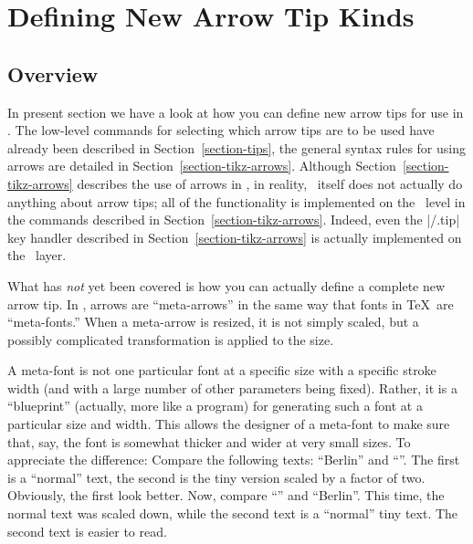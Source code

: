 %
%
%


\section{Defining New Arrow Tip Kinds}
\label{section-arrows}


\subsection{Overview}

In present section we have a look at how you can define new arrow tips
for use in \pgfname. The low-level commands for selecting which arrow
tips are to be used have already been described in
Section~\ref{section-tips}, the general syntax rules for using arrows
are detailed in Section~\ref{section-tikz-arrows}. Although
Section~\ref{section-tikz-arrows} describes the use of arrows in
\tikzname, in reality, \tikzname\ itself does not actually do anything
about arrow tips; all of the functionality is implemented on the
\pgfname\ level in the commands described in
Section~\ref{section-tikz-arrows}. Indeed, even the |/.tip| key
handler described in Section~\ref{section-tikz-arrows} is actually
implemented on the \pgfname\ layer.

What has \emph{not} yet been covered is how you can actually define a
complete new arrow tip. In \pgfname, arrows are ``meta-arrows'' in the
same way that fonts in \TeX\ are ``meta-fonts.'' When a meta-arrow is
resized, it is not simply scaled, but a possibly complicated
transformation is applied to the size.

A meta-font is not one particular font at a specific size with a
specific stroke width (and with a large number of other parameters
being fixed). Rather, it is a ``blueprint'' (actually, more like a
program) for generating such a font at a particular size and
width. This allows the designer of a meta-font to make sure that, say,
the font is somewhat thicker and wider at very small sizes. To
appreciate the difference: Compare the following texts: ``Berlin'' and
``''. The first is a ``normal'' text, the second is the tiny
version scaled by a factor of two. Obviously, the first look
better. Now, compare  ``'' and ``{\tiny Berlin}''. This time, the normal
text was scaled down, while the second text is a ``normal'' tiny
text. The second text is easier to read.


